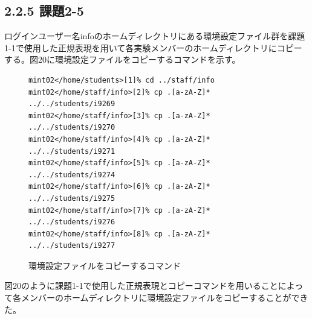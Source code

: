 \documentclass[12pt]{jreport}
\begin{document}
            \subsection*{2.2.5 課題2-5}
                ログインユーザー名infoのホームディレクトリにある環境設定ファイル群を課題1-1で使用した正規表現を用いて各実験メンバーのホームディレクトリにコピーする。図20に環境設定ファイルをコピーするコマンドを示す。
                \begin{figure}[H]
                    \begin{center}
                        \begin{screen}
                            \begin{verbatim}
mint02</home/students>[1]% cd ../staff/info
mint02</home/staff/info>[2]% cp .[a-zA-Z]* ../../students/i9269
mint02</home/staff/info>[3]% cp .[a-zA-Z]* ../../students/i9270
mint02</home/staff/info>[4]% cp .[a-zA-Z]* ../../students/i9271
mint02</home/staff/info>[5]% cp .[a-zA-Z]* ../../students/i9274
mint02</home/staff/info>[6]% cp .[a-zA-Z]* ../../students/i9275
mint02</home/staff/info>[7]% cp .[a-zA-Z]* ../../students/i9276
mint02</home/staff/info>[8]% cp .[a-zA-Z]* ../../students/i9277
                            \end{verbatim}
                        \end{screen}
                        \caption{環境設定ファイルをコピーするコマンド}
                        \label{20}
                    \end{center}
                \end{figure}
                図20のように課題1-1で使用した正規表現とコピーコマンドを用いることによって各メンバーのホームディレクトリに環境設定ファイルをコピーすることができた。
\end{document}
